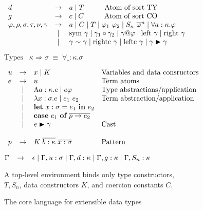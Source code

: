 {\begin{figure}[h]
\vspace{5mm}
\vspace{2mm}

$
\begin{array}{lcl}
  d & \to & a \alt T  \hspace{10mm} \textrm{Atom of sort TY}\\
  g & \to & c \alt C  \hspace{10mm}  \textrm{Atom of sort CO}\\
\varphi, \rho, \sigma, \tau, \nu, \gamma &
  \to & a \alt C \alt T \alt \varphi_1 ~ \varphi_2 \alt S_n ~
  \overline{\varphi}^n \alt \forall a:\kappa.\varphi \\
  & \alt & \textrm{sym} ~ \gamma \alt \gamma_1 \circ \gamma_2 \alt
  \gamma@\varphi \alt \textrm{left} ~ \gamma \alt \textrm{right} ~ \gamma \\
  & \alt & \gamma \sim \gamma \alt \textrm{rightc} ~ \gamma \alt
  \textrm{leftc} ~ \gamma \alt \gamma \blacktriangleright \gamma
\end{array}
$

\vspace{5mm}
\vspace{2mm}

$
\textrm{Types} \;\;\; \kappa \Rightarrow \sigma \; \equiv \; \forall \_ :\kappa. \sigma
$

\vspace{5mm}
\vspace{2mm}

$
\begin{array}{lcll}
  u & \to & x \;|\; K & \textrm{Variables and data consructors} \\
  e & \to & u & \textrm{Term atoms} \\
    & \;|\; & \Lambda a:\kappa.e \;|\; e \varphi & \textrm{Type abstractions/application} \\
    & \;|\; & \lambda x : \sigma.e \;|\; e_1 ~ e_2 & \textrm{Term abstraction/application} \\
    & \;|\; & \mbox{\bf{let}}~x:\sigma=e_1~\mbox{\bf{in}}~e_2 \\
    & \;|\; & \mbox{\bf{case}}~e_1~\mbox{\bf{of}}~\overline{p \to e_2} \\
    & \;|\; & e \blacktriangleright \gamma & \textrm{Cast}\\
    \\
p & \to & K \; \overline{b:\kappa} \; \overline{x:\sigma} & \textrm{Pattern}
\end{array}
$

\vspace{5mm}
\vspace{2mm}

$
\Gamma \;\;\; \to \;\;\; \epsilon \;|\; \Gamma,u:\sigma \;|\; \Gamma,d:\kappa
\;|\; \Gamma,g:\kappa \;|\; \Gamma,S_n:\kappa
$

A top-level environment binds only type constructors, \\
$T,S_n$, data constructors $K$, and coercion constants $C$.
\caption{The core language for extensible data types}
\label{fig:langdef}
\end{figure}}

